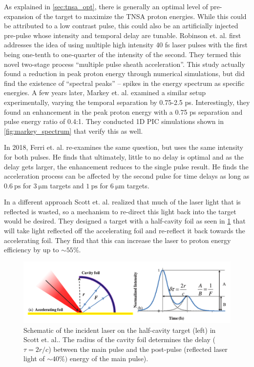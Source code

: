 As explained in \cref{sec:tnsa_opt}, there is generally an optimal level of pre-expansion of the target to maximize the TNSA proton energies\cite{McKenna_2008_LaPB,Fuchs_2007_PRL}. While this could be attributed to a low contrast pulse, this could also be an artificially injected pre-pulse whose intensity and temporal delay are tunable. Robinson et. al.\cite{Robinson_2007_PPCF} first addresses the idea of using multiple high intensity 40 fs laser pulses with the first being one-tenth to one-quarter of the intensity of the second. They termed this novel two-stage process ``multiple pulse sheath acceleration''. This study actually found a reduction in peak proton energy through numerical simulations, but did find the existence of ``spectral peaks'' -- spikes in the energy spectrum as specific energies. A few years later, Markey et. al.\cite{Markey_2010_PRL} examined a similar setup experimentally, varying the temporal separation by 0.75-2.5 ps. Interestingly, they found an enhancement in the peak proton energy with a 0.75 ps separation and pulse energy ratio of 0.4:1. They conducted 1D PIC simulations shown in \cref{fig:markey_spectrum} that verify this as well.

In 2018, Ferri et. al.\citep{Ferri_2018_PoP} re-examines the same question, but uses the same intensity for both pulses. He finds that ultimately, little to no delay is optimal and as the delay gets larger, the enhancement reduces to the single pulse result. He finds the acceleration process can be affected by the second pulse for time delays as long as $\SI{0.6}{\pico \second}$ for $\SI{3}{\micro \meter}$ targets and $\SI{1}{\pico \second}$ for $\SI{6}{\micro \meter}$ targets. 

In a different approach Scott et. al. \cite{Scott_2012_APL} realized that much of the laser light that is reflected is wasted, so a mechanism to re-direct this light back into the target would be desired. They designed a target with a half-cavity foil as seen in \cref{fig:scott_half_cavity} that will take light reflected off the accelerating foil and re-reflect it back towards the accelerating foil. They find that this can increase the laser to proton energy efficiency by up to $\sim 55 \%$.

\begin{figure}
	\centering 
	\includegraphics[width=0.75\linewidth]{planning/images/scott_half_cavity.PNG}
	\caption{Schematic of the incident laser on the half-cavity target (left) in Scott et. al.\cite{Scott_2012_APL}. The radius of the cavity foil determines the delay ($\tau = 2 r/c$) between the main pulse and the post-pulse (reflected laser light of $\sim 40 \%)$ energy of the main pulse).}
	\label{fig:scott_half_cavity}
\end{figure}


